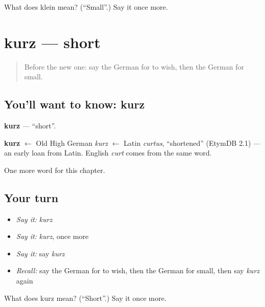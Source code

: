 \begin{tcolorbox}[breakable,colback=teal!4,colframe=teal!35!black,title={Before you move on}]
What does klein mean? (\textquotedblleft{}Small\textquotedblright{}.) Say it once more.
\end{tcolorbox}
\section[kurz]{kurz — short}

\label{lesson:GE-C89-kurz}



\begin{quote}
Before the new one: say the German for to wish, then the German for small.
\end{quote}

\subsection*{You'll want to know: kurz}
\textbf{kurz} — \textquotedblleft{}short\textquotedblright{}.

\begin{cousinweb}
\textbf{kurz} $\leftarrow$ Old High German \emph{kurz} $\leftarrow$ Latin \emph{curtus}, \textquotedblleft{}shortened\textquotedblright{} (EtymDB 2.1) — an early loan from Latin. English \emph{curt} comes from the same word.
\end{cousinweb}

\begin{grammarlens}[title={What you've built}]
One more word for this chapter.
\end{grammarlens}

\subsection*{Your turn}
\begin{itemize}
\raggedright
  \item \emph{Say it:} \emph{kurz}
  \item \emph{Say it:} \emph{kurz}, once more
  \item \emph{Say it:} say \emph{kurz}
  \item \emph{Recall:} say the German for to wish, then the German for small, then say \emph{kurz} again
\end{itemize}

\begin{tcolorbox}[breakable,colback=teal!4,colframe=teal!35!black,title={Before you move on}]
What does kurz mean? (\textquotedblleft{}Short\textquotedblright{}.) Say it once more.
\end{tcolorbox}
